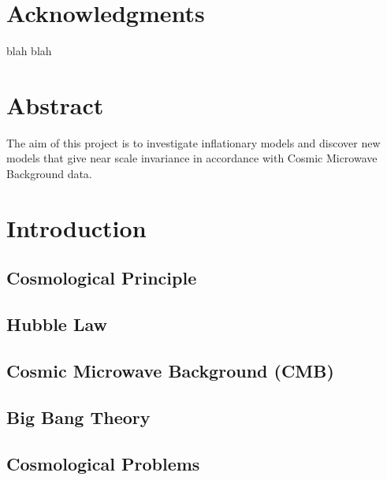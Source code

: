 \documentclass[12pt]{article} %
\begin{document}

\tableofcontents %

\newpage %
\section{Acknowledgments}

blah blah

\newpage

\section{Abstract}
The aim of this project is to investigate inflationary models and discover new models that give near scale invariance in accordance with Cosmic Microwave Background data.

\newpage

\section{Introduction} %

\subsection{Cosmological Principle}

\subsection{Hubble Law}

\subsection{Cosmic Microwave Background (CMB)}

\subsection{Big Bang Theory}

\subsection{Cosmological Problems}
\end{document}

